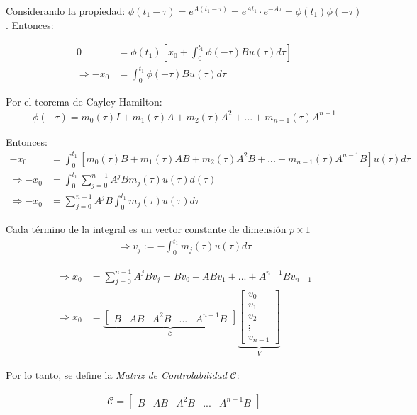 Considerando la propiedad: $\phi(t_1-\tau)=e^{A(t_1-\tau)}=e^{At_1}\cdot e^{-A\tau}=\phi(t_1)\phi(-\tau)$. Entonces:

\begin{align*}
    0 &=\phi(t_1)\left[x_0+\int_0^{t_1}\phi(-\tau)Bu(\tau)d\tau\right] \\
    \Longrightarrow -x_0 &= \int_0^{t_1}\phi(-\tau)Bu(\tau)d\tau
\end{align*}

Por el teorema de Cayley-Hamilton:
\begin{align*}
    \phi(-\tau)=m_0(\tau)I+m_1(\tau)A+m_2(\tau)A^2+...+m_{n-1}(\tau)A^{n-1}
\end{align*}

Entonces:
\begin{align*}
    -x_0 &= \int_0^{t_1}\left[m_0(\tau)B+m_1(\tau)AB+m_2(\tau)A^2B+...+m_{n-1}(\tau)A^{n-1}B \right]u(\tau)d\tau\\
    \Longrightarrow -x_0 &= \int_0^{t_1} \sum_{j=0}^{n-1}A^jBm_j(\tau)u(\tau)d(\tau)\\
    \Longrightarrow -x_0 &= \sum_{j=0}^{n-1}A^jB \int_0^{t_1} m_j(\tau)u(\tau)d\tau
\end{align*}

Cada término de la integral es un vector constante de dimensión $p\times 1$
\begin{align*}
    \Longrightarrow v_j := -\int_0^{t_1}m_j(\tau)u(\tau)d\tau
\end{align*}

\begin{align*}
    \Longrightarrow x_0 &= \sum_{j=0}^{n-1}A^jBv_j =Bv_0+ABv_1+...+A^{n-1}Bv_{n-1}\\
     \Longrightarrow x_0 &= \underbrace{\left[
    \begin{array}{c|c|c|c|c}
     B & AB & A^2B & ... & A^{n-1}B
    \end{array}\right]}_{\mathcal{C}} \underbrace{\left[
    \begin{array}{c}
     v_0\\ \hline v_1 \\ \hline v_2 \\ \hline \vdots \\ \hline v_{n-1} 
    \end{array}\right]}_{V}
\end{align*}

Por lo tanto, se define la \emph{Matriz de Controlabilidad} $\mathcal{C}$:

\begin{align*}
    \mathcal{C}=\left[
    \begin{array}{c|c|c|c|c}
     B & AB & A^2B & ... & A^{n-1}B
    \end{array}\right]
\end{align*}

